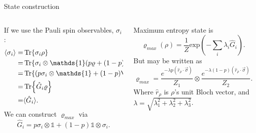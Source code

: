 \documentclass{cubeamer}
\newcommand{\Id}{\mathds{1}}%
\begin{document}
\begin{frame}{State construction}
    \begin{columns}
        \begin{column}{0.5\textwidth}
            If we use the Pauli spin observables, $\sigma_{i}$:
            \begin{align*}
                \langle \sigma_{i}\rangle=&\Tr{\sigma_{i} \rho}\\
                =&\Tr{\sigma_{i}\otimes\Id(p\varrho+(1-p)S\varrho S)}\\
                =&\Tr{(p\sigma_{i}\otimes\Id+(1-p)\Id\otimes\sigma_{i})\varrho}\\
                =&\Tr{\hat{G}_{i}\varrho}\\
                =&\langle \hat{G}_{i}\rangle.
            \end{align*}
            We can construct $\varrho_{max}$ via
            \begin{equation*}
                \hat{G}_{i}=p\sigma_{i}\otimes\Id+(1-p)\Id\otimes\sigma_{i}.
            \end{equation*}
        \end{column}
        \begin{column}{0.5\textwidth}
            Maximum entropy state is
            \begin{equation*}
                \varrho_{max}(\rho)=\frac{1}{Z}\text{exp}(-\sum_{i}\lambda_{i}\hat{G}_{i}).
            \end{equation*}
            But may be written as
            \begin{equation*}
                \varrho_{max}=\frac{e^{-\lambda p(\hat{r}_{\rho}\cdot\vec{\sigma})}}{Z_{1}} \otimes \frac{e^{-\lambda(1-p)(\hat{r}_{\rho}\cdot\vec{\sigma})}}{Z_{2}}.
            \end{equation*}
            Where $\hat{r}_{\rho}$ is $\rho$'s unit Bloch vector, and $\lambda=\sqrt{\lambda^{2}_{1}+\lambda^{2}_{2}+\lambda^{2}_{3}}$.
        \end{column}
    \end{columns}
\end{frame}
\end{document}
